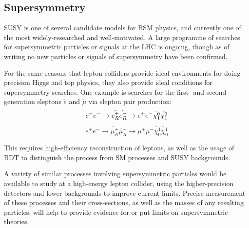 \subsection{Supersymmetry}
\acrfull{SUSY} is one of several candidate models for \acrshort{BSM} physics, and currently one of the most widely-researched and well-motivated. A large programme of searches for supersymmetric particles or signals at the \acrshort{LHC} is ongoing, though as of writing no new particles or signals of supersymmetry have been confirmed.

For the same reasons that lepton colliders provide ideal environments for doing precision Higgs and top physics, they also provide ideal conditions for supersymmetry searches. One example \cite{slepton-pairs} is searches for the first- and second-generation sleptons $\tilde{e}$ and $\tilde{\mu}$ via slepton pair production:
$$
		e^+ e^- \rightarrow \tilde{e_R^+} \tilde{e_R^-} \rightarrow e^+ e^- \tilde{\chi^0_1} \tilde{\chi^0_1} \\
$$
$$
		e^+ e^- \rightarrow \tilde{\mu_R^+} \tilde{\mu_R^-} \rightarrow \mu^+ \mu^- \tilde{\chi_0^1} \tilde{\chi_0^1}
$$

This requires high-efficiency reconstruction of leptons, as well as the usage of \acrfull{BDT} to distinguish the process from \acrshort{SM} processes and \acrshort{SUSY} backgrounds. 

A variety of similar processes involving supersymmetric particles would be available to study at a high-energy lepton collider, using the higher-precision detectors and lower backgrounds to improve current limits. Precise measurement of these processes and their cross-sections, as well as the masses of any resulting particles, will help to provide evidence for or put limits on supersymmetric theories.

